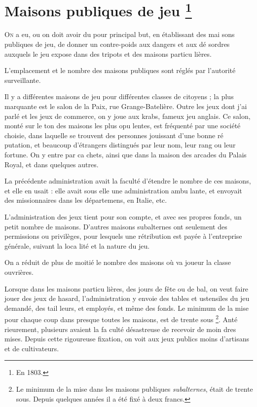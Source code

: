 \chapter
  [Maisons publiques de Jeu]
  {Maisons publiques de jeu \footnote{En 1803.}}

\lettrine{O}{n} a eu, ou on doit avoir du pour
principal but, en établissant des mai%
sons publiques de jeu, de donner un
contre-poids aux dangers et aux dé%
sordres auxquels le jeu expose dans
des tripots et des maisons particu%
lières.

L'emplacement et le nombre des
maisons publiques sont réglés par
l'autorité surveillante.

Il y a différentes maisons de jeu
pour différentes classes de citoyens ;
la plus marquante est le salon de la
Paix, rue Grange-Batelière. Outre
les jeux dont j'ai parlé et les jeux
de commerce, on y joue aux krabs,
fameux jeu anglais. Ce salon, monté
sur le ton des maisons les plus opu%
lentes, est fréquenté par une société
choisie, dans laquelle se trouvent des
personnes jouissant d'une bonne ré%
putation, et beaucoup d'étrangers
distingués par leur nom, leur rang
ou leur fortune. On y entre par ca%
chets, ainsi que dans la maison des
arcades du Palais Royal, et dans
quelques autres.

La précédente administration avait 
la faculté d'étendre le nombre de ces
maisons, et elle en usait : elle avait
sous elle une administration ambu%
lante, et envoyait des missionnaires
dans les départemens, en Italie, etc.

L'administration des jeux tient pour
son compte, et avec ses propres fonds,
un petit nombre de maisons. D'autres
maisons subalternes ont seulement
des permissions ou privilèges, pour
lesquels une rétribution est payée à
l'entreprise générale, suivant la loca%
lité et la nature du jeu.

On a réduit de plus de moitié le
nombre des maisons où va joueur la
classe ouvrières.

Lorsque dans les maisons particu%
lières, des jours de fête ou de bal,
on veut faire jouer des jeux de hasard,
l'administration y envoie des tables et
ustensiles du jeu demandé, des tail%
leurs, et employés, et même des
fonds. Le minimum de la mise pour
chaque coup dans presque toutes les
maisons, est de trente sous
\footnote{
  Le minimum de la mise dans les maisons publiques
  \emph{subalternes}, était de trente sous. Depuis quelques années
  il a été fixé à deux francs.
}. Anté%
rieurement, plusieurs avaient la fa%
culté désastreuse de recevoir de moin%
dres mises. Depuis cette rigoureuse
fixation, on voit aux jeux publics
moins d'artisans et de cultivateurs.

